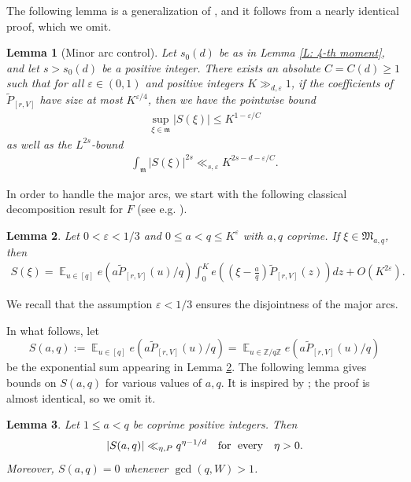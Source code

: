 \documentclass[11pt]{amsart}
\newtheorem{lemma}{Lemma}[section]
\theoremstyle{definition}
\DeclareMathOperator*{\E}{\mathbb{E}}
\newcommand{\Z}{{\mathbb Z}}
\newcommand{\veps}{\varepsilon}
\newcommand{\abs}[1]{\mathopen{}\left| #1\mathclose{}\right|}
\newcommand{\brac}[1]{\mathopen{}\left( #1 \mathclose{}\right)}
\begin{document}
The following lemma is a generalization of \cite[Lemma B.4]{PSS23}, and it follows from a nearly identical proof, which we omit.
\begin{lemma}[Minor arc control]\label{L: minor arcs}
    Let $s_0(d)$ be as in Lemma \ref{L: 4-th moment}, and let $s> s_0(d)$ be a positive integer. There exists an absolute $C=C(d)\geq 1$ such that for all $\veps\in(0,1)$
    and positive integers $K\gg_{d,\veps} 1$, if the coefficients of $\widetilde{P}_{[r, V]}$ have size at most $K^{\veps/4}$, then 
    we have the pointwise bound
    \begin{align*}
        \sup_{\xi\in\mathfrak{m}}|S(\xi)|
        \leq K^{1-\veps/C}
    \end{align*}
    as well as the $L^{2s}$-bound
    \begin{align*}
        \int_\mathfrak{m}\abs{S(\xi)}^{2s}
        \ll_{s, \veps}K^{2s-d-\veps/C}.
    \end{align*}

\end{lemma}

In order to handle the major arcs, we start with the following classical decomposition result for $F$  (see e.g. \cite[Corollary 5.2]{Wo23}).
\begin{lemma}\label{L: major arc expression}
    Let $0<\veps<1/3$ and $0\leq a < q \leq K^\veps$ with $a,q$ coprime.
    If $\xi\in\mathfrak{M}_{a,q}$, then 
    \begin{align*}
        S(\xi)
        = \E_{u\in[q]}e(a \widetilde{P}_{[r, V]}(u)/q)\int_0^K e\brac{\brac{\xi-\frac{a}{q}}\widetilde{P}_{[r, V]}(z)}dz + O(K^{2\veps}).
    \end{align*}
\end{lemma}
We recall that the assumption $\veps<1/3$ ensures the disjointness of the major arcs.

In what follows, let $$S(a,q):= \E_{u\in[q]}e(a \widetilde{P}_{[r, V]}(u)/q)=\E_{u\in\Z/q\Z}e(a \widetilde{P}_{[r, V]}(u)/q)$$ be the exponential sum appearing in Lemma \ref{L: major arc expression}. The following lemma gives bounds on $S(a,q)$ for various values of $a,q$.  It is inspired by \cite[Lemma 5.3]{CC23}; the proof is almost identical, so we omit it.
\begin{lemma}\label{L: S(a,q)}
    Let $1\leq a < q$ be coprime positive integers.  
    Then 
    \begin{align*}
        |S(a,q)|\ll_{\eta, P} q^{\eta - 1/d}\quad \textrm{for\; every}\quad \eta>0.
    \end{align*}
    Moreover, $S(a,q) = 0$ whenever $\gcd(q, W)>1$. 
\end{lemma}
\end{document}
